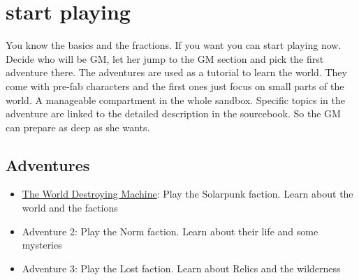\section{start playing}

You know the basics and the fractions. If you want you can start playing now. Decide who will be GM, let her jump to the GM section and pick the first adventure there.
The adventures are used as a tutorial to learn the world. They come with pre-fab characters and the first ones just focus on small parts of the world. A manageable compartment in the whole sandbox.
Specific topics in the adventure are linked to the detailed description in the sourcebook. So the GM can prepare as deep as she wants.

\subsection{Adventures}

\begin{itemize}
\item \hyperref[ch:the world destroying machine]{The World Destroying Machine}: Play the Solarpunk faction. Learn about the world and the factions
\item Adventure 2: Play the Norm faction. Learn about their life and some mysteries
\item Adventure 3: Play the Lost faction. Learn about Relics and the wilderness
\end{itemize}